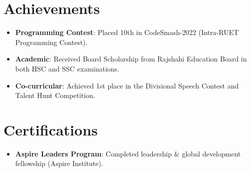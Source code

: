 \documentclass[letterpaper,11pt]{article}
\newcommand{\resumeItem}[2]{
  \item\small{
    \textbf{#1}{: #2 \vspace{-4pt}}
  }
}
\newcommand{\resumeSubItem}[2]{\resumeItem{#1}{#2}\vspace{-2pt}}
\newcommand{\resumeSubHeadingListStart}{\begin{itemize}[leftmargin=*]}
\newcommand{\resumeSubHeadingListEnd}{\end{itemize}\vspace{-5pt}}
\begin{document}
\section{Achievements}
\resumeSubHeadingListStart
  \resumeSubItem{Programming Contest}{Placed 10th in CodeSmash-2022 (Intra-RUET Programming Contest).}
  \resumeSubItem{Academic}{Received Board Scholarship from Rajshahi Education Board in both HSC and SSC examinations.}
  \resumeSubItem{Co-curricular}{Achieved 1st place in the Divisional Speech Contest and Talent Hunt Competition.}
\resumeSubHeadingListEnd

\section{Certifications}
\resumeSubHeadingListStart
  \resumeSubItem{Aspire Leaders Program}{Completed leadership \& global development fellowship (Aspire Institute).}
\resumeSubHeadingListEnd
\end{document}
